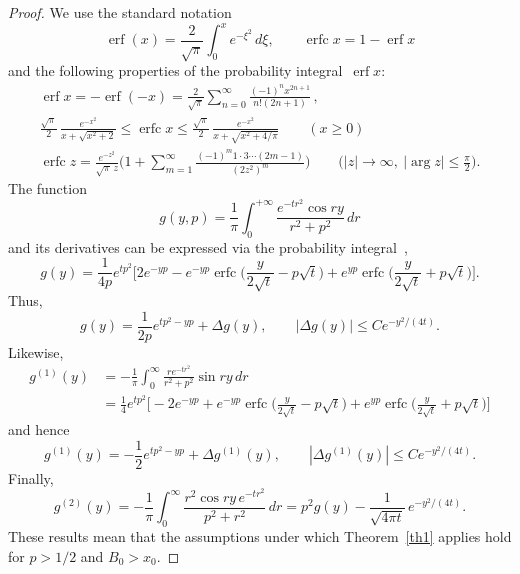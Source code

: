 \documentclass{amsart}
\theoremstyle{plain}
\theoremstyle{definition}
\numberwithin{equation}{section}
\begin{document}
\begin{proof}
We use the standard notation~\cite{20}
$$
\operatorname{erf}(x)=\frac{2}{\sqrt{\pi}}\int_0^x e^{-\xi^2}\,d\xi,\qquad
\operatorname{erfc} x=1-\operatorname{erf}x
$$
and the following properties of the probability
integral~$\operatorname{erf}x$:
\begin{gather*}
\operatorname{erf}x=-\operatorname{erf}(-x)=\frac{2}{\sqrt{\pi}}
\sum_{n=0}^\infty\frac{(-1)^nx^{2n+1}}{n!(2n+1)}\,,
\\
\frac{\sqrt{\pi}}{2}\,\frac{e^{-x^2}}{x+\sqrt{x^2+2}}\leqslant
\operatorname{erfc} x\leqslant\frac{\sqrt{\pi}}{2}\,
\frac{e^{-x^2}}{x+\sqrt{x^2+4/\pi}}\qquad
(x\geqslant 0)
\\
\operatorname{erfc} z=\frac{e^{-z^2}}{\sqrt{\pi}\,z}\biggl(1+\sum_{m=1}^\infty
\frac{(-1)^m1\cdot 3\cdots(2m-1)}{(2z^2)^m}\biggr)\qquad
\biggl(|z|\to\infty,\
|{\arg z}|\leqslant\frac{\pi}{2}\biggr).
\end{gather*}
The function
$$
g(y,p)=\frac{1}{\pi}\int_0^{+\infty}
\frac{e^{-tr^2}\cos ry}{r^2+p^2}\,dr
$$
and its derivatives can be expressed via the probability
integral~\cite{19,20},
\begin{equation}
\label{eq6.5}
g(y)=\frac{1}{4p}e^{tp^2}\biggl[2e^{-yp}-e^{-yp}\operatorname{erfc}
\biggl(\frac{y}{2\sqrt{t}}-p\sqrt{t}\biggr)+
e^{yp}\operatorname{erfc}\biggl(\frac{y}{2\sqrt{t}}+p\sqrt{t}\biggr)\biggr].
\end{equation}
Thus,
\begin{equation}
\label{eq6.6}
g(y)=\frac{1}{2p}e^{tp^2-yp}+\Delta g(y),\qquad
|\Delta g(y)|\leqslant Ce^{-y^2/(4t)}.
\end{equation}
Likewise,
\begin{align}
\nonumber
g^{(1)}(y)&=-\frac{1}\pi\int_0^\infty\frac{re^{-tr^2}}{r^2+p^2}\sin ry\,dr
\\
\label{eq6.7}
&=\frac{1}{4}e^{tp^2}\biggl[-2e^{-yp}+e^{-yp}\operatorname{erfc}
\biggl(\frac{y}{2\sqrt{t}}-p\sqrt{t}\biggr)+
e^{yp}\operatorname{erfc}\biggl(\frac{y}{2\sqrt{t}}+p\sqrt{t}\biggr)\biggr]
\end{align}
and hence
\begin{equation}
\label{eq6.8}
g^{(1)}(y)=-\frac{1}{2}e^{tp^2-yp}+\Delta g^{(1)}(y),\qquad
|\Delta g^{(1)}(y)|\leqslant Ce^{-y^2/(4t)}.
\end{equation}
Finally,
\begin{equation}
\label{eq6.9}
g^{(2)}(y)=-\frac{1}{\pi}\int_0^\infty
\frac{r^2\cos ry\,e^{-tr^2}}{p^2+r^2}\,dr=p^2g(y)-
\frac{1}{\sqrt{4\pi t}}\,e^{-y^2/(4t)}.
\end{equation}
These results mean that the assumptions under which
Theorem~\ref{th1} applies hold for $p>1/2$ and $B_0>x_0$.


\end{proof}
\end{document}
